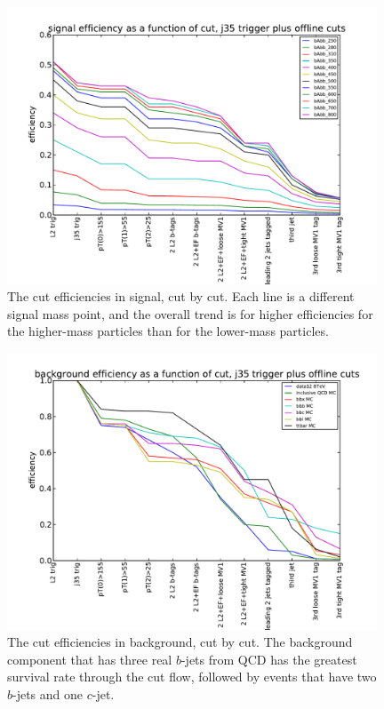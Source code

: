 \begin{figure}
    \center
	\includegraphics[width=0.98\textwidth]{TriggerCuts/cut_efficiencies_j35_signal.pdf}	
    \caption{The cut efficiencies in signal, cut by cut.  Each line is a different
    signal mass point, and the overall trend is for higher efficiencies for the higher-mass
    particles than for the lower-mass particles. \label{fig:signal_eff_cutflow}}
\end{figure}






\begin{figure}
    \center
	\includegraphics[width=0.98\textwidth]{TriggerCuts/cut_efficiencies_j35_background.pdf}	
    \caption{The cut efficiencies in background, cut by cut. The background component that has 
    three real $b$-jets from QCD has the greatest survival rate through the cut flow, followed
    by events that have two $b$-jets and one $c$-jet.\label{fig:background_eff_cutflow}}
\end{figure}

